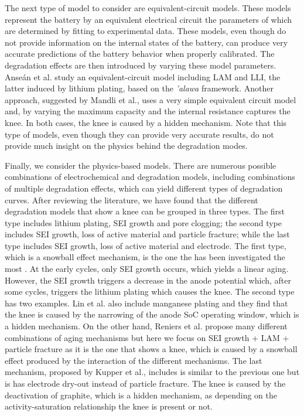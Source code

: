 \documentclass[journal=jpcl, manuscript=article, layout=onecolumn]{achemso}
\begin{document}
The next type of model to consider are equivalent-circuit models. These models represent the battery by an equivalent electrical circuit the parameters of which are determined by fitting to experimental data. These models, even though do not provide information on the internal states of the battery, can produce very accurate predictions of the battery behavior when properly calibrated. The degradation effects are then introduced by varying these model parameters. Anse\'an et al. \cite{ansean_operando_2017} study an equivalent-circuit model including LAM and LLI, the latter induced by lithium plating, based on the \emph{'alawa} framework\cite{dubarry_synthesize_2012}. Another approach, suggested by Mandli et al.,\cite{mandli_analysis_2019} uses a very simple equivalent circuit model and, by varying the maximum capacity and the internal resistance captures the knee. In both cases, the knee is caused by a hidden mechanism. Note that this type of models, even though they can provide very accurate results, do not provide much insight on the physics behind the degradation modes.

Finally, we consider the physics-based models. There are numerous possible combinations of electrochemical and degradation models, including combinations of multiple degradation effects, which can yield different types of degradation curves.\cite{reniers_review_2019} After reviewing the literature, we have found that the different degradation models that show a knee can be grouped in three types. The first type includes lithium plating, SEI growth and pore clogging; the second type includes SEI growth, loss of active material and particle fracture; while the last type includes SEI growth, loss of active material and electrode. The first type, which is a snowball effect mechanism, is the one the has been investigated the most \cite{yang_modeling_2017,yang_understanding_2018,muller_model-based_2019,atalay_theory_2020,keil_electrochemical_2020}. At the early cycles, only SEI growth occurs, which yields a linear aging. However, the SEI growth triggers a decrease in the anode potential which, after some cycles, triggers the lithium plating which causes the knee. The second type has two examples. Lin et al. \cite{lin_comprehensive_2013} also include manganese plating and they find that the knee is caused by the narrowing of the anode SoC operating window, which is a hidden mechanism. On the other hand, Reniers et al. \cite{reniers_review_2019} propose many different combinations of aging mechanisms but here we focus on SEI growth + LAM + particle fracture as it is the one that shows a knee, which is caused by a snowball effect produced by the interaction of the different mechanisms. The last mechanism, proposed by Kupper et al.,\cite{kupper_end--life_2018} includes is similar to the previous one but is has electrode dry-out instead of particle fracture. The knee is caused by the deactivation of graphite, which is a hidden mechanism, as depending on the activity-saturation relationship the knee is present or not.
\end{document}
